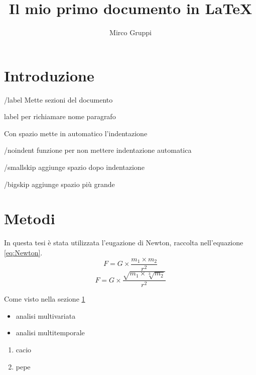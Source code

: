 \documentclass[12pt]{article} %
\title{Il mio primo documento in LaTeX}
\author{Mirco Gruppi}
\begin{document}

\maketitle

\tableofcontents %
\listoffigures

\section{Introduzione} \label{Intro}
/label Mette sezioni del documento

label per richiamare nome paragrafo

Con spazio mette in automatico l'indentazione

\noindent 
/noindent funzione per non mettere indentazione automatica

\smallskip 
/smallskip aggiunge spazio dopo indentazione

\bigskip 
/bigskip aggiunge spazio più grande

\section{Metodi}
In questa tesi è stata utilizzata l'eugazione di Newton, raccolta nell'equazione \ref{eq:Newton}.
\begin{equation}
    F=G \times \frac{m_1 \times m_2}{r^2}
    \label{eq:Newton} %
\end{equation}
\begin{equation}
    F=G \times \frac{\sqrt{m_1 \times \sqrt[3]{m_2}}}{r^2}
\end{equation}

Come visto nella sezione \ref{Intro} 

\begin{itemize}
    \item analisi multivariata
    \item analisi multitemporale
\end{itemize}

\begin{enumerate}
    \item cacio
    \item pepe
\end{enumerate}
\end{document}
